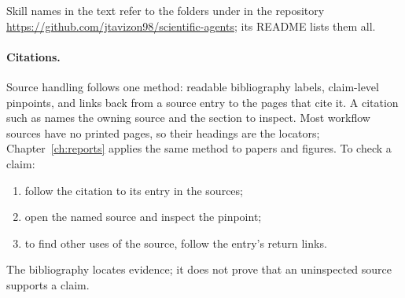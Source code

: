 \documentclass[11pt,a4paper,oneside,openany]{book}
\begin{document}
Skill names in the text refer to the folders under  in the repository
\url{https://github.com/jtavizon98/scientific-agents}; its README lists them all.

\paragraph{Citations.} Source handling follows one method: readable bibliography labels,
claim-level pinpoints, and links back from a source entry to the pages that cite it. A
citation such as \cite[Validation order]{skill:implementation}
names the owning source and the section to inspect. Most workflow sources have no printed
pages, so their headings are the locators; Chapter~\ref{ch:reports} applies the same method
to papers and figures. To check a claim:
\begin{enumerate}
  \item follow the citation to its entry in the sources;
  \item open the named source and inspect the pinpoint;
  \item to find other uses of the source, follow the entry's return links.
\end{enumerate}
The bibliography locates evidence; it does not prove that an uninspected source supports
a claim.

\begingroup
{}
\tableofcontents
\endgroup



\mainmatter
\pagestyle{fancy}












\backmatter
\printbibliography[heading=bibintoc,title={Sources}]
\end{document}
